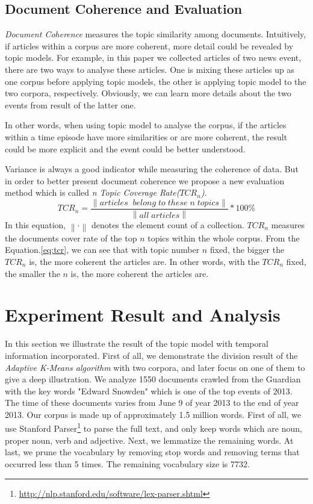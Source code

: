 \documentclass[runningheads,a4paper]{llncs}
\begin{document}
\subsection{Document Coherence and Evaluation}
\label{section4.4}
\emph{Document Coherence} measures the topic similarity among documents. Intuitively, if articles within a corpus are more coherent, more detail could be revealed by topic models. For example, in this paper we collected articles of two news event, there are two ways to analyse these articles. One is mixing these articles up as one corpus before applying topic models, the other is applying topic model to the two corpora, respectively. Obviously, we can learn more details about the two events from result of the latter one.

In other words, when using topic model to analyse the corpus, if the articles within a time episode have more similarities or are more coherent, the result could be more explicit and the event could be better understood.

Variance is always a good indicator while measuring the coherence of data. But in order to better present document coherence we propose a new evaluation method which is called \emph{n Topic Coverage Rate($TCR_n$)}.
\begin{equation}\label{eq:tcr}
TCR_n = \frac{\left \| articles\;\;belong\;to\;these\;n\;topics \right \|}{\left \| all\;articles \right \|} * 100\%
\end{equation}
In this equation, $\left \| \cdot \right \|$ denotes the element count of a collection. $TCR_n$ measures the documents cover rate of the top $n$ topics within the whole corpus. From the Equation.\ref{eq:tcr}, we can see that with topic number $n$ fixed, the bigger the $TCR_n$ is, the more coherent the articles are. In other words, with the $TCR_n$ fixed,  the smaller the $n$ is, the more coherent the articles are.

\section{Experiment Result and Analysis}
\label{section5}
In this section we illustrate the result of the topic model with temporal information incorporated. First of all, we demonstrate the division result of the \emph{Adaptive K-Means algorithm} with two corpora, and later focus on one of them to give a deep illustration. We analyze 1550 documents crawled from the Guardian with the key words "Edward Snowden" which is one of the top events of 2013. The time of these documents varies from June 9 of year 2013 to the end of year 2013. Our corpus is made up of approximately 1.5 million words. First of all, we use Stanford Parser\footnote{\url{http://nlp.stanford.edu/software/lex-parser.shtml}} to parse the full text, and only keep words which are noun, proper noun, verb and adjective. Next, we lemmatize the remaining words. At last, we prune the vocabulary by removing stop words and removing terms that occurred less than 5 times. The remaining vocabulary size is 7732.
\end{document}
